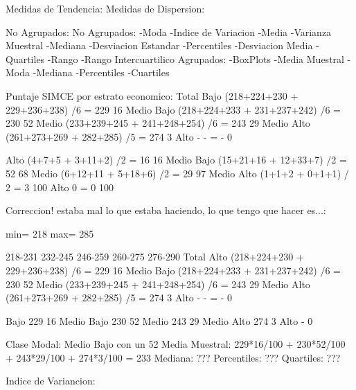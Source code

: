 

Medidas de Tendencia:			Medidas de Dispersion:

No Agrupados:				No Agrupados:
	-Moda					-Indice de Variacion
	-Media					-Varianza Muestral
	-Mediana				-Desviacion Estandar
	-Percentiles				-Desviacion Media
	-Quartiles				-Rango
						-Rango Intercuartilico
Agrupados:					-BoxPlots	
	-Media Muestral				
	-Moda					
	-Mediana				
	-Percentiles				
	-Cuartiles				

Puntaje SIMCE por estrato economico:
							Total     %
Bajo		(218+224+230 + 229+236+238) /6	=	229	16
Medio Bajo	(218+224+233 + 231+237+242) /6	=	230	52
Medio		(233+239+245 +	241+248+254) /6	=	243	29
Medio Alto	(261+273+269 +  282+285) /5	= 	274	3
Alto		-		-		=	-	0

Alto		(4+7+5 + 3+11+2) /2		=	16	16
Medio Bajo	(15+21+16 + 12+33+7) /2		=	52	68
Medio		(6+12+11 + 5+18+6) /2		=	29	97
Medio Alto	(1+1+2 + 0+1+1) / 2		=	3	100
Alto		0				=	0	100

Correccion! estaba mal lo que estaba haciendo, lo que tengo que hacer es...:

min= 218
max= 285
	
		218-231	232-245	246-259	260-275	276-290		Total     %
Alto		(218+224+230 + 229+236+238) /6	=	229	16
Medio Bajo	(218+224+233 + 231+237+242) /6	=	230	52
Medio		(233+239+245 +	241+248+254) /6	=	243	29
Medio Alto	(261+273+269 +  282+285) /5	= 	274	3
Alto		-		-		=	-	0


Bajo		229	16%
Medio Bajo	230	52%
Medio		243	29%
Medio Alto	274	3%
Alto		-	0%









Clase Modal: Medio Bajo con un 52%
Media Muestral: 229*16/100  + 230*52/100 + 243*29/100 + 274*3/100 = 233
Mediana: ??? 
Percentiles: ??? 
Quartiles:  ???

Indice de Variancion: 
